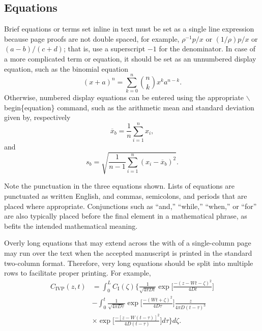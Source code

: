 \documentclass[12pt]{article}
\begin{document}
\subsection{Equations}
Brief equations or terms set inline in text must be set as a single line expression because page proofs are not double spaced, for example, $\rho^{-1}p/x$ or $(1/{\rho})p/x$  or $(a-b)/(c+d)$; that is, use a superscript $-1$ for the denominator.  In case of a more complicated term or equation, it should be set as an unnumbered display equation,
such as the binomial equation
\begin{displaymath}
(x+a)^n = \sum^{n}_{k=0} \binom{n}{k} x^k a^{n-k}.
\end{displaymath}
Otherwise, numbered display equations can be entered using the appropriate $\backslash$begin\{equation\} command, such as the arithmetic mean and standard deviation given by, respectively
\begin{equation}
\overline{x}_b = \frac{1}{n}\sum_{i=1}^n x_i,                                              \label{eq:amean}
\end{equation}
and
\begin{equation}
s_b = \sqrt{\frac{1}{n-1}\sum_{i=1}^n (x_i - \overline{x}_b)^2}.                            \label{eq:sdev}
\end{equation}

Note the punctuation in the three equations shown.  Lists of equations are punctuated as written English, and commas, semicolons, and periods that are placed where appropriate.  Conjunctions such as ``and,'' ``while,'' ``when,'' or ``for'' are also typically placed before the final element in a mathematical phrase, as befits the intended mathematical meaning.

Overly long equations that may extend across the with of a single-column page may run over the text when the accepted manuscript is printed in the standard two-column format.  Therefore, very long equations should be split into multiple rows to facilitate proper printing.  For example,
\begin{equation}
    \begin{split}
        C_{\text{IVP}}(z,t) &= \int_0^L C_{\text{I}}(\zeta)\biggl\{\frac{1}{\sqrt{4 \pi D t}}\exp\biggl[\frac{-(z-W t - \zeta)^2}{4 D t}\biggr] \\
        &- \int_0^t \frac{1}{\sqrt{4 \pi D \tau}}\exp\biggl[\frac{-(W t + \zeta)^2}{4 D \tau}\biggr]\frac{z}{4 \pi D(t - \tau)^3} \\
        &\times \exp\biggl[\frac{-[z-W(t - \tau)]^2}{4 D(t - \tau)}\biggr] d\tau \biggr\} d\zeta.
    \end{split}
    \label{eq:ivsolu}
\end{equation}
\end{document}

